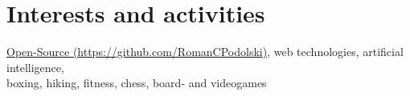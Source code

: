 \documentclass[a4paper,10pt]{article} %
\begin{document}
 
 
\section{Interests and activities}
 
\href{https://github.com/RomanCPodolski}{Open-Source (\faGithub https://github.com/RomanCPodolski)}, web technologies, artificial intelligence, \\
boxing, hiking, fitness, chess, board- and videogames
 
 
\newpage
 
\end{document}
